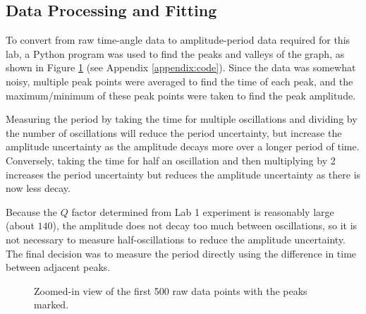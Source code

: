 \documentclass[aps,twocolumn,secnumarabic,nobalancelastpage,amsmath,amssymb,nofootinbib,floatfix]{revtex4}
\begin{document}
\subsection{Data Processing and Fitting}

To convert from raw time-angle data to amplitude-period data required for this lab, a Python program was used to find
the peaks and valleys of the graph, as shown in Figure \ref{fig:rawdata} (see Appendix \ref{appendix:code}).
Since the data was somewhat noisy, multiple peak points were averaged to find the time of each peak, and the
maximum/minimum of these peak points were taken to find the peak amplitude.

Measuring the period by taking the time for multiple oscillations and dividing by the number of oscillations will reduce
the period uncertainty, but increase the amplitude uncertainty as the amplitude decays more over a longer period of
time. Conversely, taking the time for half an oscillation and then multiplying by 2 increases the period uncertainty but
reduces the amplitude uncertainty as there is now less decay.

Because the $Q$ factor determined from Lab 1 experiment is reasonably large (about $140$), the amplitude does not decay
too much between oscillations, so it is not necessary to measure half-oscillations to reduce the amplitude uncertainty.
The final decision was to measure the period directly using the difference in time between adjacent peaks.

\begin{figure}[htb]
    \caption{Zoomed-in view of the first 500 raw data points with the peaks marked.}
    \label{fig:rawdata}
\end{figure}
\end{document}
